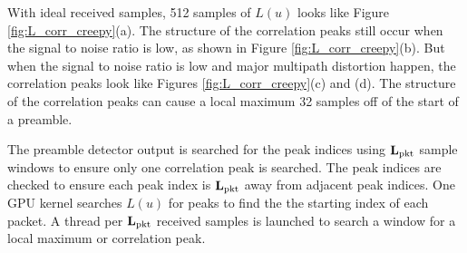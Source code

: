 With ideal received samples, 512 samples of $L(u)$ looks like Figure \ref{fig:L_corr_creepy}(a).
The structure of the correlation peaks still occur when the signal to noise ratio is low, as shown in Figure \ref{fig:L_corr_creepy}(b).
But when the signal to noise ratio is low and major multipath distortion happen, the correlation peaks look like Figures \ref{fig:L_corr_creepy}(c) and (d).
The structure of the correlation peaks can cause a local maximum 32 samples off of the start of a preamble.

The preamble detector output is searched for the peak indices using $\mathbf{L}_\text{pkt}$ sample windows to ensure only one correlation peak is searched.
The peak indices are checked to ensure each peak index is $\mathbf{L}_\text{pkt}$ away from adjacent peak indices.
One GPU kernel searches $L(u)$ for peaks to find the the starting index of each packet.
A thread per $\mathbf{L}_\text{pkt}$ received samples is launched to search a window for a local maximum or correlation peak.

